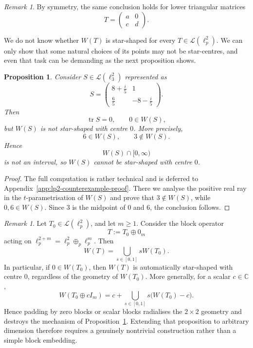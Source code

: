 \documentclass[11pt]{amsart}
\numberwithin{equation}{section}
\newtheorem{proposition}[theorem]{Proposition}
\theoremstyle{definition}
\theoremstyle{remark}
\newtheorem{remark}[theorem]{Remark}
\newcommand{\C}{\mathbb{C}}
\begin{document}
\begin{remark}
By symmetry, the same conclusion holds for lower triangular matrices
\[
T=\begin{pmatrix} a & 0 \\ c & d \end{pmatrix}.
\]
\end{remark}
We do not know whether $W(T)$ is star-shaped for every $T \in \mathcal L(\ell_p^2).$
We can only show that some natural choices of its points
may not be star-centres, and even that task can be demanding as the next proposition shows.
\begin{proposition}\label{prop:lp2-counterexample-full}
Consider $S \in \mathcal L (\ell_3^2)$ represented as
\[
S=
\begin{pmatrix}
8+\frac{i}{5} & 1\\[1mm]
\frac65 & -8-\frac{i}{5}
\end{pmatrix}.
\]
Then
\[
\operatorname{tr}S=0,
\qquad
0\in W(S),
\]
but $W(S)$ is \emph{not} star-shaped with centre $0$. More precisely,
\[
6\in W(S),
\qquad
3\notin W(S).
\]
Hence
\[
W(S)\cap [0,\infty)
\]
is not an interval, so $W(S)$ cannot be star-shaped with centre $0$.
\end{proposition}

\begin{proof}
The full computation is rather technical and is deferred to
Appendix~\ref{app:lp2-counterexample-proof}. There we analyse the positive
real ray in the $t$-parametrisation of $W(S)$ and prove that
$3\notin W(S)$, while $0,6\in W(S)$. Since $3$ is the midpoint of $0$ and
$6$, the conclusion follows.
\end{proof}

\begin{remark}\label{rem:lp2-padding-fails}
Let \(T_0\in\mathcal L(\ell_p^2)\), and let \(m\ge1\). Consider the block operator
\[
 T:=T_0\oplus 0_m
\]
acting on $\ell_p^{2+m}=\ell_p^2\oplus_p\ell_p^m$. Then
\[
W(T)=\bigcup_{s\in[0,1]} sW(T_0).
\]
In particular, if $0\in W(T_0)$, then $W(T)$ is automatically star-shaped with centre $0$, regardless of the geometry of $W(T_0)$. More generally, for a scalar $c\in\C$,
\[
W(T_0\oplus cI_m)=c+\bigcup_{s\in[0,1]} s\bigl(W(T_0)-c\bigr).
\]
Hence padding by zero blocks or scalar blocks radialises the $2\times2$ geometry and destroys the mechanism of Proposition~\ref{prop:lp2-counterexample-full}. Extending that proposition to arbitrary dimension therefore requires a genuinely nontrivial construction rather than a simple block embedding.
\end{remark}
\end{document}
